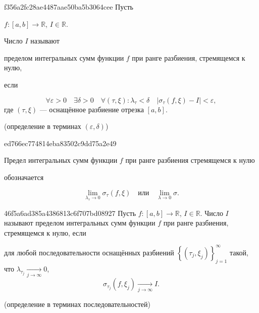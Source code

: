 \begin{note}{f356a2fc28ae4487aae50ba5b3064cee}
    Пусть \begin{icloze}{3}\( f : [a, b] \to \mathbb R \), \( I \in \mathbb R \).\end{icloze}
    Число \( I \) называют \begin{icloze}{2}пределом интегральных сумм функции \( f \) при ранге разбиения, стремящемся к нулю,\end{icloze} если
    \begin{icloze}{1}
        \[
            \forall \varepsilon > 0 \quad \exists \delta > 0 \quad \forall (\tau, \xi) : \lambda_\tau < \delta \quad \left| \sigma_\tau (f, \xi) - I \right| < \varepsilon,
        \]
        где \( (\tau, \xi) \) --- оснащённое разбиение отрезка \( [a, b] \).
    \end{icloze}

    \begin{center}
        \tiny (определение в терминах \( (\varepsilon, \delta) \))
    \end{center}
\end{note}

\begin{note}{ed766ec774814eba83502c9dd75a2e49}
    \begin{icloze}{2}Предел интегральных сумм функции \( f \) при ранге разбиения стремящемся к нулю\end{icloze} обозначается
    \begin{icloze}{1}
        \[
            \lim_{\lambda_\tau \to 0} \sigma_\tau (f, \xi) \quad \text{или} \quad \lim_{\lambda \to 0} \sigma.
        \]
    \end{icloze}
\end{note}

\begin{note}{46f5a6ad385a4386813c6f707bd08927}
    Пусть \( f : [a, b] \to \mathbb R \), \( I \in \mathbb R \).
    Число \( I \) называют пределом интегральных сумм функции \( f \) при ранге разбиения, стремящемся к нулю, если
    \begin{icloze}{1}
        для любой последовательности оснащённых разбиений \( \left\{ (\tau_j, \xi_j) \right\}_{j = 1}^{\infty} \) такой, что \( \lambda_{\tau_j} \underset{j \to \infty}\longrightarrow 0 \),
    \[
        \sigma_{\tau_j} (f, \xi_j) \underset{j \to \infty}\longrightarrow I.
    \]
    \end{icloze}

    \begin{center}
        \tiny (определение в терминах последовательностей)
    \end{center}
\end{note}

